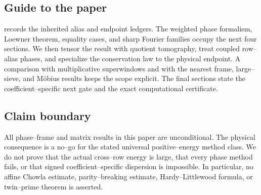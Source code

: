 \subsection{Guide to the paper}

 records the inherited alias and endpoint
ledgers.  The weighted phase formalism, Loewner theorem, equality cases,
and sharp Fourier families occupy the next four sections.  We then tensor
the result with quotient tomography, treat coupled row--alias phases, and
specialize the conservation law to the physical endpoint.  A comparison
with multiplicative superwindows and with the nearest frame, large--sieve,
and M\"obius results keeps the scope explicit.  The final sections state
the coefficient--specific next gate and the exact computational
certificate.

\subsection{Claim boundary}

All phase--frame and matrix results in this paper are unconditional.  The
physical consequence is a no--go for the stated universal positive--energy
method class.  We do not prove that the actual cross--row energy is large,
that every phase method fails, or that signed coefficient--specific
dispersion is impossible.  In particular, no affine Chowla estimate,
parity--breaking estimate, Hardy--Littlewood formula, or twin--prime
theorem is asserted.
